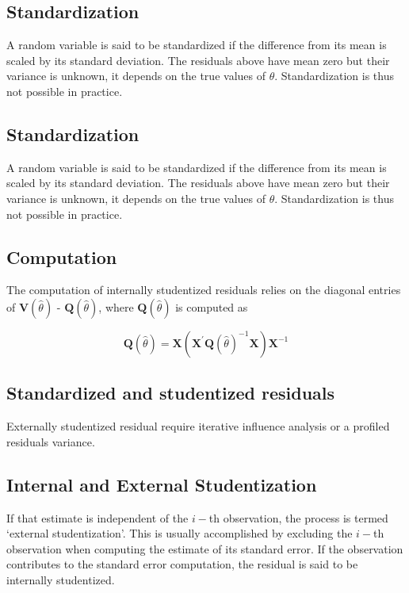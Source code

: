 \documentclass[Main.tex]{subfiles}
\begin{document}
	\subsection{Standardization} %
	
	A random variable is said to be standardized if the difference from its mean is scaled by its standard deviation. The residuals above have mean zero but their variance is unknown, it depends on the true values of $\theta$. Standardization is thus not possible in practice.
	
\subsection{Standardization} %

A random variable is said to be standardized if the difference from its mean is scaled by its standard deviation. The residuals above have mean zero but their variance is unknown, it depends on the true values of $\theta$. Standardization is thus not possible in practice.


	\subsection{Computation}%
	
	The computation of internally studentized residuals relies on the diagonal entries of $\boldsymbol{V} (\hat{\theta})$ - $\boldsymbol{Q} (\hat{\theta})$, where $\boldsymbol{Q} (\hat{\theta})$ is computed as
	
	\[ \boldsymbol{Q} (\hat{\theta}) = \boldsymbol{X} ( \boldsymbol{X}^{\prime}\boldsymbol{Q} (\hat{\theta})^{-1}\boldsymbol{X})\boldsymbol{X}^{-1} \]
	
	\newpage
\subsection{Standardized and studentized residuals} %

Externally  studentized residual require iterative influence analysis or a profiled residuals variance.





	
	\subsection{Internal and External Studentization} %
	If that estimate is independent of the $i-$th observation, the process is termed `external studentization'. This is usually accomplished by excluding the $i-$th observation when computing the estimate of its standard error. If the observation contributes to the
	standard error computation, the residual is said to be internally studentized.
	
\end{document}

